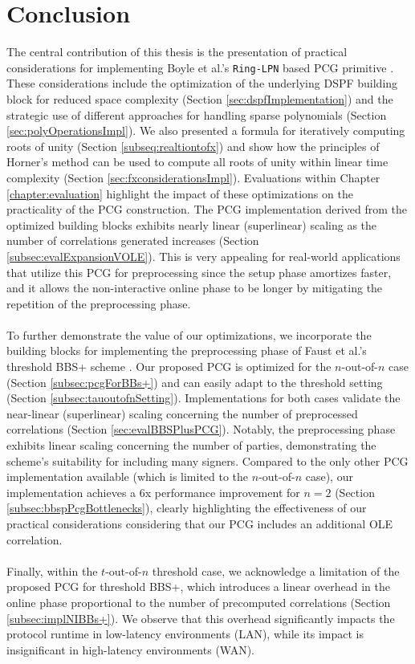 \chapter{Conclusion}
The central contribution of this thesis is the presentation of practical considerations for implementing Boyle et al.'s \texttt{Ring-LPN} based PCG primitive \cite{boyle2020efficient}. These considerations include the optimization of the underlying DSPF building block for reduced space complexity (Section \ref{sec:dspfImplementation}) and the strategic use of different approaches for handling sparse polynomials (Section \ref{sec:polyOperationsImpl}). We also presented a formula for iteratively computing roots of unity (Section \ref{subseq:realtiontofx}) and show how the principles of Horner's method \cite{horner1819xxi} can be used to compute all roots of unity within linear time complexity (Section \ref{sec:fxconsiderationsImpl}). Evaluations within Chapter \ref{chapter:evaluation} highlight the impact of these optimizations on the practicality of the PCG construction. The PCG implementation derived from the optimized building blocks exhibits nearly linear (superlinear) scaling as the number of correlations generated increases (Section \ref{subsec:evalExpansionVOLE}). This is very appealing for real-world applications that utilize this PCG for preprocessing since the setup phase amortizes faster, and it allows the non-interactive online phase to be longer by mitigating the repetition of the preprocessing phase.
\\\\
To further demonstrate the value of our optimizations, we incorporate the building blocks for implementing the preprocessing phase of Faust et al.'s threshold BBS+ scheme \cite{faust2023non}. Our proposed PCG is optimized for the $n$-out-of-$n$ case (Section \ref{subsec:pcgForBBs+}) and can easily adapt to the threshold setting (Section \ref{subsec:tauoutofnSetting}). Implementations for both cases validate the near-linear (superlinear) scaling concerning the number of preprocessed correlations (Section \ref{sec:evalBBSPlusPCG}). Notably, the preprocessing phase exhibits linear scaling concerning the number of parties, demonstrating the scheme's suitability for including many signers. Compared to the only other PCG implementation available \cite{abram2022low} (which is limited to the $n$-out-of-$n$ case), our implementation achieves a 6x performance improvement for $n=2$ (Section \ref{subsec:bbspPcgBottlenecks}), clearly highlighting the effectiveness of our practical considerations considering that our PCG includes an additional OLE correlation.
\\\\
Finally, within the $t$-out-of-$n$ threshold case, we acknowledge a limitation of the proposed PCG for threshold BBS+, which introduces a linear overhead in the online phase proportional to the number of precomputed correlations (Section \ref{subsec:implNIBBs+}). We observe that this overhead significantly impacts the protocol runtime in low-latency environments (LAN), while its impact is insignificant in high-latency environments (WAN).

